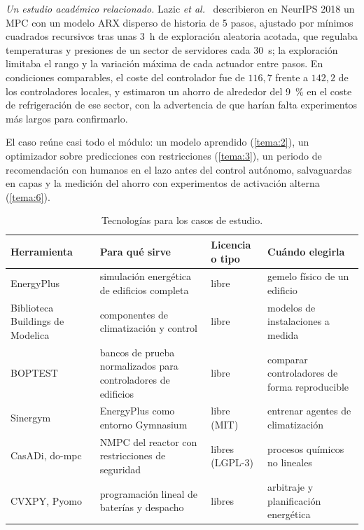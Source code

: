\emph{Un estudio académico relacionado.} Lazic \emph{et al.}~\cite{lazic} describieron en NeurIPS 2018 un MPC con un modelo ARX disperso de historia de 5 pasos, ajustado por mínimos cuadrados recursivos tras unas 3~h de exploración aleatoria acotada, que regulaba temperaturas y presiones de un sector de servidores cada 30~s; la exploración limitaba el rango y la variación máxima de cada actuador entre pasos. En condiciones comparables, el coste del controlador fue de $116{,}7$ frente a $142{,}2$ de los controladores locales, y estimaron un ahorro de alrededor del 9~\% en el coste de refrigeración de ese sector, con la advertencia de que harían falta experimentos más largos para confirmarlo.

El caso reúne casi todo el módulo: un modelo aprendido (\cref{tema:2}), un optimizador sobre predicciones con restricciones (\cref{tema:3}), un periodo de recomendación con humanos en el lazo antes del control autónomo, salvaguardas en capas y la medición del ahorro con experimentos de activación alterna (\cref{tema:6}).

\begin{table}[htbp]
\centering\footnotesize
\begin{tabularx}{\textwidth}{@{}>{\raggedright\arraybackslash}p{3.1cm}>{\raggedright\arraybackslash}X>{\raggedright\arraybackslash}p{2.0cm}>{\raggedright\arraybackslash}X@{}}
\toprule
Herramienta & Para qué sirve & Licencia o tipo & Cuándo elegirla \\
\midrule
EnergyPlus~\cite{crawley} & simulación energética de edificios completa & libre & gemelo físico de un edificio \\
Biblioteca Buildings de Modelica~\cite{modelica} & componentes de climatización y control & libre & modelos de instalaciones a medida \\
BOPTEST~\cite{boptest} & bancos de prueba normalizados para controladores de edificios & libre & comparar controladores de forma reproducible \\
Sinergym~\cite{sinergym} & EnergyPlus como entorno Gymnasium & libre (MIT) & entrenar agentes de climatización \\
CasADi, do-mpc~\cite{casadi,dompc} & NMPC del reactor con restricciones de seguridad & libres (LGPL-3) & procesos químicos no lineales \\
CVXPY, Pyomo & programación lineal de baterías y despacho & libres & arbitraje y planificación energética \\
\bottomrule
\end{tabularx}
\caption{Tecnologías para los casos de estudio.}
\label{tab:tec5}
\end{table}

